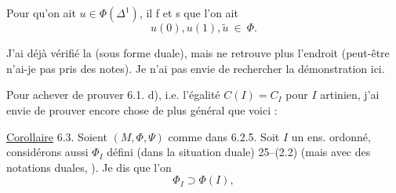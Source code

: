 
Pour qu'on ait $u\in\Phi(\Delta^1)$, il f et s
que l'on ait
\[
 u(0),u(1),\widetilde u\ \in\ \Phi.\tag*{(6.2.5.5)}
\]

J'ai déjà vérifié la  (sous forme
duale), mais ne retrouve plus l'endroit
(peut-être n'ai-je pas pris des notes).
Je n'ai pas envie de rechercher la
démonstration ici.

Pour achever de prouver 6.1. d),
i.e. l'égalité $C(I)=C_I$ pour $I$
artinien, j'ai envie de prouver encore
 chose de plus général que voici :

\uline{Corollaire} 6.3. Soient $(M,\Phi,\Psi)$  comme
dans 6.2.5. Soit $I$ un ens. ordonné,
  considérons aussi $\Phi_I$ défini (dans la
 situation duale)  25--(2.2) (mais
avec des notations duales, ). Je dis que l'on
\[
 \Phi_I\supset\Phi(I),\tag*{(6.3.1)}
\]

